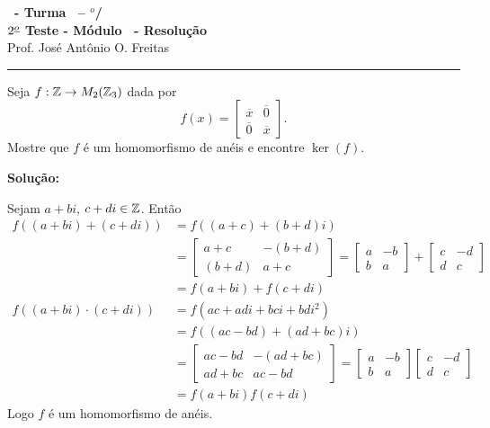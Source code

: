 \documentclass[12pt]{exam}
\begin{document}
\begin{center}
{\Large\bf \disciplina\ - Turma \turma\ -- \semestre$^{o}$/\ano} \\ \vspace{9pt} {\large\bf
$2^{\underline{o}}$ Teste - M\'odulo \modulo\ - Resolu\c{c}\~ao}\\
\vspace{9pt} Prof. Jos{\'e} Ant{\^o}nio O. Freitas
\end{center}
\hrule

\vspace{.6cm}

\questao{} Seja $f : \mathbb{Z} \to M_2(\mathbb{Z}_3)$ dada por
\[
	f(x) = \begin{bmatrix}
		\overline{x} & \overline{0}\\
		\overline{0} & \overline{x}
	\end{bmatrix}.
\]
Mostre que $f$ \'e um homomorfismo de an\'eis e encontre $\ker(f)$.

\noindent\textbf{Solu\c{c}\~ao:}

Sejam $a + bi$, $c + di \in \mathbb{Z}$. Ent\~ao
\begin{align*}
	f((a + bi) + (c + di)) &= f((a + c) + (b + d)i) \\&= \begin{bmatrix}
		a + c & -(b + d)\\
		(b + d) & a + c
	\end{bmatrix} = \begin{bmatrix}
		a & -b\\
		b & a
	\end{bmatrix} + \begin{bmatrix}
		c & -d\\
		d & c
	\end{bmatrix}\\ &= f(a + bi) + f(c + di)\\
	f((a + bi)\cdot (c + di)) &= f(ac + adi + bci + bdi^2) \\ &= f((ac - bd) + (ad + bc)i) \\ &= \begin{bmatrix}
		ac - bd & -(ad + bc)\\
		ad + bc & ac - bd
	\end{bmatrix} = \begin{bmatrix}
		a & -b\\
		b & a
	\end{bmatrix} \begin{bmatrix}
		c & -d\\
		d & c
	\end{bmatrix}\\ &= f(a + bi)f(c + di)
\end{align*}
Logo $f$ \'e um homomorfismo de an\'eis.
\end{document}
